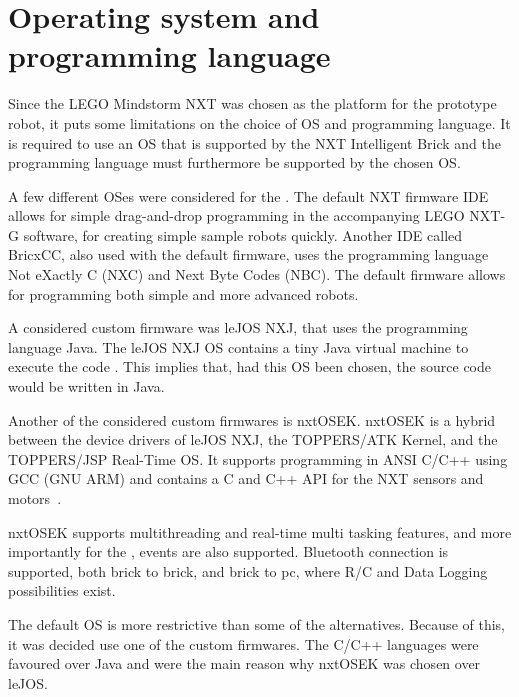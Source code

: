 \section{Operating system and programming language} \label{sec:os_and_proglanguage}
Since the LEGO Mindstorm NXT was chosen as the platform for the prototype robot, it puts some limitations on the choice of OS and programming language. It is required to use an OS that is supported by the NXT Intelligent Brick and the programming language must furthermore be supported by the chosen OS.

A few different OSes were considered for the \projname{}. The default NXT firmware IDE allows for simple drag-and-drop programming in the accompanying LEGO NXT-G software, for creating simple sample robots quickly. Another IDE called BricxCC, also used with the default firmware, uses the programming language Not eXactly C (NXC) and Next Byte Codes (NBC). The default firmware allows for programming both simple and more advanced robots. 

A considered custom firmware was leJOS NXJ, that uses the programming language Java. The leJOS NXJ OS contains a tiny Java virtual machine to execute the code \citep{lejos}. This implies that, had this OS been chosen, the source code would be written in Java.

Another of the considered custom firmwares is nxtOSEK. nxtOSEK is a hybrid between the device drivers of leJOS NXJ, the TOPPERS/ATK Kernel, and the TOPPERS/JSP Real-Time OS. It supports programming in ANSI C/C++ using GCC (GNU ARM) and contains a C and C++ API for the NXT sensors and motors~\citep{nxtosek, toppers_atk, toppers_jsp, nxtOSEK2, nxtosek_api}.

nxtOSEK supports multithreading and real-time multi tasking features, and more importantly for the \projname{}, events are also supported. Bluetooth connection is supported, both brick to brick, and brick to pc, where R/C and Data Logging possibilities exist.

The default OS is more restrictive than some of the alternatives. Because of this, it was decided use one of the custom firmwares. The C/C++ languages were favoured over Java and were the main reason why nxtOSEK was chosen over leJOS.








